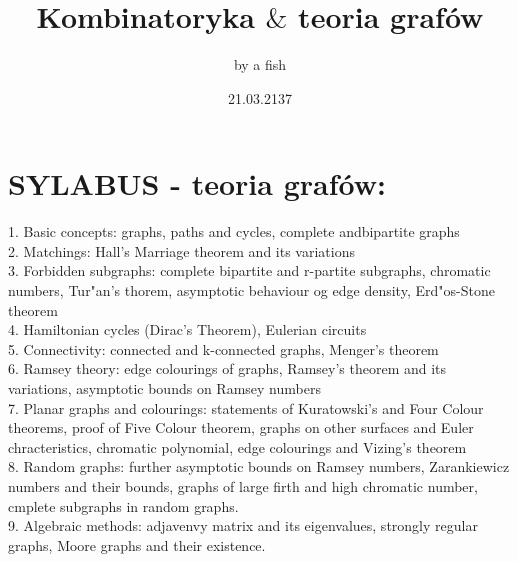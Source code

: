 \documentclass{article}[13pt]
\title {Kombinatoryka $\&$ teoria grafów}
\author{by a fish}
\date {21.03.2137}
\begin{document}
\maketitle

\newpage

\section*{SYLABUS - teoria grafów:}
1. Basic concepts: graphs, paths and cycles, complete andbipartite graphs\\
2. Matchings: Hall's Marriage theorem and its variations\\
3. Forbidden subgraphs: complete bipartite and r-partite subgraphs, chromatic numbers, Tur"an's thorem, asymptotic behaviour og edge density, Erd"os-Stone theorem\\
4. Hamiltonian cycles (Dirac's Theorem), Eulerian circuits\\
5. Connectivity: connected and k-connected graphs, Menger's theorem\\
6. Ramsey theory: edge colourings of graphs, Ramsey's theorem and its variations, asymptotic bounds on Ramsey numbers\\
7. Planar graphs and colourings: statements of Kuratowski's and Four Colour theorems, proof of Five Colour theorem, graphs on other surfaces and Euler chracteristics, chromatic polynomial, edge colourings and Vizing's theorem\\
8. Random graphs: further asymptotic bounds on Ramsey numbers, Zarankiewicz numbers and their bounds, graphs of large firth and high chromatic number, cmplete subgraphs in random graphs.\\
9. Algebraic methods: adjavenvy matrix and its eigenvalues, strongly regular graphs, Moore graphs and their existence.

\newpage


\tableofcontents

\newpage
\end{document}
